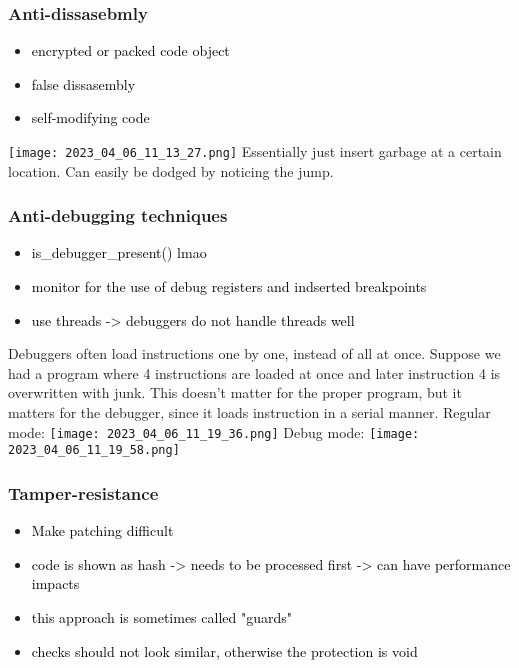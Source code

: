 \documentclass[main.tex,fontsize=8pt,paper=a4,paper=portrait,DIV=calc,]{scrartcl}
\begin{document}
\subsubsection{Anti-dissasebmly}
\begin{itemize}
\item \textcolor{black}{encrypted or packed code object}
\item \textcolor{black}{false dissasembly}
\item \textcolor{black}{self-modifying code}
\end{itemize} 
\texttt{[image: 2023\_04\_06\_11\_13\_27.png]}\newline
Essentially just insert garbage at a certain location.\newline
Can easily be dodged by noticing the jump.

\subsubsection{Anti-debugging techniques}
\begin{itemize}
\item \textcolor{black}{is\_debugger\_present() lmao}
\item \textcolor{black}{monitor for the use of debug registers and indserted breakpoints}
\item \textcolor{black}{use threads -> debuggers do not handle threads well}
\end{itemize} 
Debuggers often load instructions one by one, instead of all at once.\newline
Suppose we had a program where 4 instructions are loaded at once and later instruction 4 is overwritten with junk.\newline
This doesn't matter for the proper program, but it matters for the debugger, since it loads instruction in a serial manner.\newline
Regular mode:\newline
\texttt{[image: 2023\_04\_06\_11\_19\_36.png]}\newline
Debug mode: \newline
\texttt{[image: 2023\_04\_06\_11\_19\_58.png]}

\subsubsection{Tamper-resistance}
\begin{itemize}
\item \textcolor{black}{Make patching difficult}
\item \textcolor{black}{code is shown as hash -> needs to be processed first -> can have performance impacts}
\item \textcolor{black}{this approach is sometimes called "guards"}
\item \textcolor{black}{checks should not look similar, otherwise the protection is void}
\end{itemize} 
\end{document}
